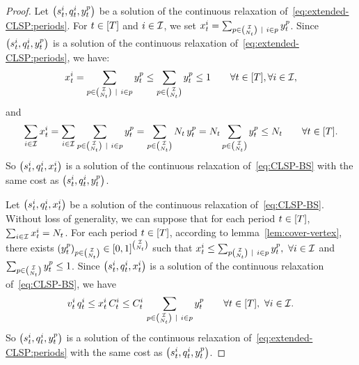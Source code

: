 \begin{proof}
Let $\bracket{\inventory_t^i, \quantity_t^i, y_t^p}$ be a solution of the continuous relaxation of~\eqref{eq:extended-CLSP:periods}.
For $t\in\range{\horizon}$ and $i\in\mathcal{I}$, we set $x_t^i=\sum_{p\in{\mathcal{I}\choose N_t}~|~i\in p} y_t^p$.
Since $\bracket{\inventory_t^i, \quantity_t^i, y_t^p}$ is a solution of the continuous relaxation of~\eqref{eq:extended-CLSP:periods}, we have:
\begin{equation}
\setup_t^i
= \sum_{p\in{\REF\choose\nbsetups_t}~|~i\in p} y_t^p
\le \sum_{p\in{\REF\choose\nbsetups_t}} y_t^p
\le 1
\qquad \forall t\in\range{\horizon},\forall i\in\REF,
\end{equation}
and
\begin{equation}
\sum_{i\in\REF}\setup_t^i
= \sum_{i\in\REF}\sum_{p\in{\REF\choose\nbsetups_t}~|~i\in p} y_t^p
= \sum_{p\in{\REF\choose\nbsetups_t}} \nbsetups_t\, y_t^p
= \nbsetups_t \sum_{p\in{\REF\choose\nbsetups_t}} y_t^p
\le \nbsetups_t
\qquad \forall t\in\range{\horizon}.
\end{equation}
So $\bracket{\inventory_t^i, \quantity_t^i, \setup_t^i}$  is a solution of the continuous relaxation of~\eqref{eq:CLSP-BS} with the same cost as $\bracket{\inventory_t^i, \quantity_t^i, y_t^p}$.


Let $\bracket{\inventory_t^i, \quantity_t^i, \setup_t^i}$ be a solution of the continuous relaxation of~\eqref{eq:CLSP-BS}. Without loss of generality, we can suppose that for each period $t\in\range{\horizon}$, $\sum_{i\in\mathcal{I}}x_t^i=N_t$.
For each period $t\in\range{\horizon}$, according to lemma~\cref{lem:cover-vertex}, there exists
$\bracket{y_t^p}_{p\in{\REF\choose\nbsetups_t}}\in\sqbracket{0,1}^{\REF\choose\nbsetups_t}$ such that
$x_t^i \le \sum_{p{\mathcal{I}\choose N_t}~|~i\in p} y_t^p,\ \forall i\in\mathcal{I}$ and
$\sum_{p\in{\mathcal{I}\choose N_t}}y_t^p \le 1$.
Since $\bracket{\inventory_t^i, \quantity_t^i, \setup_t^i}$ is a solution of the continuous relaxation of~\eqref{eq:CLSP-BS}, we have
\begin{equation}
\rate_t^i\, \quantity_t^i
\le \setup_t^i\, \capacity_t^i
\le \capacity_t^i\, \sum_{p\in{\REF\choose\nbsetups_t}~|~i\in p} y_t^p
\qquad \forall t\in\range{\horizon},\ \forall i\in\REF.
\end{equation}
So $\bracket{\inventory_t^i, \quantity_t^i, y_t^p}$ is a solution of the continuous relaxation of~\eqref{eq:extended-CLSP:periods} with the same cost as $\bracket{\inventory_t^i, \quantity_t^i, y_t^p}$.
\end{proof}



